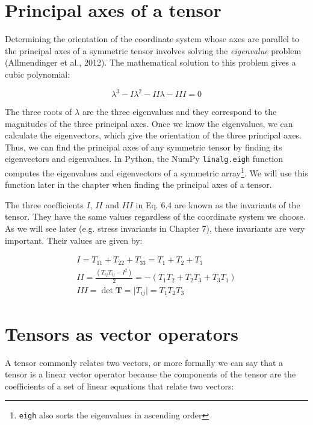 \documentclass[a4paper , 12pt]{book}
\newcommand{\code}[1]{\colorbox{light-gray}{\texttt{#1}}}
\begin{document}
\section{Principal axes of a tensor}\label{princAxes}

Determining the orientation of the coordinate system whose axes are parallel to the principal axes of a symmetric tensor involves solving the \textit{eigenvalue} problem (Allmendinger et al., 2012). The mathematical solution to this problem gives a cubic polynomial:

\begin{equation}
    \lambda^3-I\lambda^2-II\lambda-III=0
\end{equation}

The three roots of $\lambda$ are the three eigenvalues and they correspond to the magnitudes of the three principal axes. Once we know the eigenvalues, we can calculate the eigenvectors, which give the orientation of the three principal axes. Thus, we can find the principal axes of any symmetric tensor by finding its eigenvectors and eigenvalues. In Python, the NumPy \code{linalg.eigh} function computes the eigenvalues and eigenvectors of a symmetric array\footnote{\code{eigh} also sorts the eigenvalues in ascending order}. We will use this function later in the chapter when finding the principal axes of a tensor.

The three coefficients $I$, $II$ and $III$ in Eq. 6.4 are known as the invariants of the tensor. They have the same values regardless of the coordinate system we choose. As we will see later (e.g. stress invariants in Chapter 7), these invariants are very important. Their values are given by:

\begin{equation}
    \begin{gathered}
        I=T_{11}+T_{22}+T_{33}=T_1+T_2+T_3 \\
        II=\frac{(T_{ij}T_{ij}-I^2)}{2}=-(T_1T_2+T_2T_3+T_3T_1) \\
        III=\det\mathbf{T}=\vert T_{ij}\vert = T_1T_2T_3 
    \end{gathered}
\end{equation}

\section{Tensors as vector operators}

A tensor commonly relates two vectors, or more formally we can say that a tensor is a linear vector operator because the components of the tensor are the coefficients of a set of linear equations that relate two vectors:
\end{document}
